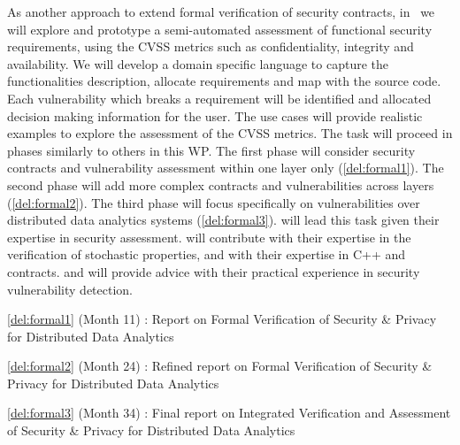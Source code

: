 \begin{Workpackage}{\thewpno}
\begin{Task}
\end{Task}


\begin{Task}

\TaskResults{%
\ref{del:formal1},
\ref{del:formal2},
\ref{del:formal3}
}
\TaskHeader{}
As another approach to extend formal verification of security contracts, in \theTask\ we will explore and prototype a semi-automated assessment of functional security requirements, using the CVSS metrics such as confidentiality, integrity and availability.
We will develop a domain specific language to capture the functionalities description, allocate requirements and map with the source code. Each vulnerability which breaks a requirement will be identified and allocated decision making information for the user.
The use cases will provide realistic examples to explore the assessment of the CVSS metrics.
The task will proceed in phases similarly to others in this WP. The first phase will consider security contracts and vulnerability assessment within one layer only (\ref{del:formal1}). The second phase will add more complex contracts and vulnerabilities across layers (\ref{del:formal2}). The third phase will focus specifically on vulnerabilities over distributed data analytics systems (\ref{del:formal3}).
\YAGshort will lead this task given their expertise in security assessment. \SA will contribute with their expertise in the verification of stochastic properties, and \UCM with their expertise in C++ and contracts. \IBMshort and \SOPRAshort will provide advice with their  practical experience in security vulnerability detection.

\end{Task}


\begin{WPDeliverables}
  \begin{compactitem}
  \item \ref{del:formal1} (Month 11) : Report on Formal Verification of Security \& Privacy for Distributed Data Analytics
\item \ref{del:formal2} (Month 24) : 
Refined report on Formal Verification of Security \& Privacy for Distributed Data Analytics 
\item \ref{del:formal3} (Month 34) : Final report on Integrated Verification and Assessment of Security \& Privacy for Distributed Data Analytics 
\end{compactitem}
\end{WPDeliverables}
\end{Workpackage}
